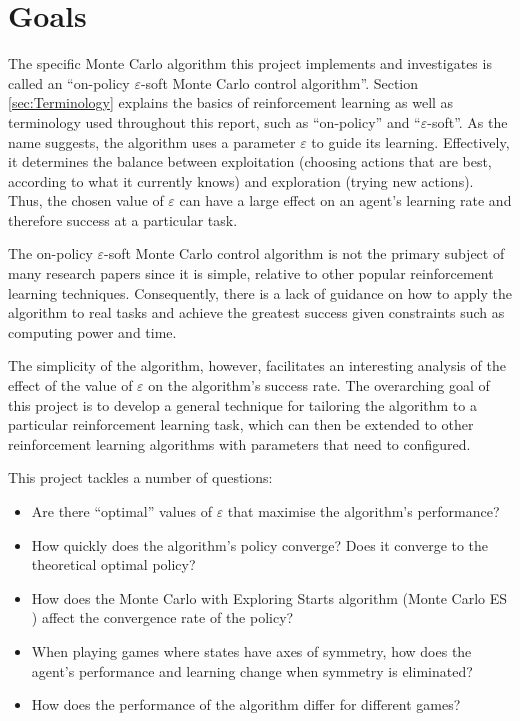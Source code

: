 \documentclass[11pt,a4paper]{report}
\begin{document}
\section{Goals}

The specific Monte Carlo algorithm this project implements and investigates is called an ``on-policy $\varepsilon$-soft Monte Carlo control algorithm''. Section \ref{sec:Terminology} explains the basics of reinforcement learning as well as terminology used throughout this report, such as ``on-policy'' and ``$\varepsilon$-soft''. As the name suggests, the algorithm uses a parameter $\varepsilon$ to guide its learning. Effectively, it determines the balance between exploitation (choosing actions that are best, according to what it currently knows) and exploration (trying new actions). Thus, the chosen value of $\varepsilon$ can have a large effect on an agent's learning rate and therefore success at a particular task.

The on-policy $\varepsilon$-soft Monte Carlo control algorithm is not the primary subject of many research papers since it is simple, relative to other popular reinforcement learning techniques. Consequently, there is a lack of guidance on how to apply the algorithm to real tasks and achieve the greatest success given constraints such as computing power and time.

The simplicity of the algorithm, however, facilitates an interesting analysis of the effect of the value of $\varepsilon$ on the algorithm's success rate. The overarching goal of this project is to develop a general technique for tailoring the algorithm to a particular reinforcement learning task, which can then be extended to other reinforcement learning algorithms with parameters that need to configured.

This project tackles a number of questions:

\begin{itemize}
	\item Are there ``optimal'' values of $\varepsilon$ that maximise the algorithm's performance?
	\item How quickly does the algorithm's policy converge? Does it converge to the theoretical optimal policy?
    \item How does the Monte Carlo with Exploring Starts algorithm (Monte Carlo ES \cite{rl-book}) affect the convergence rate of the policy?
	\item When playing games where states have axes of symmetry, how does the agent's 
performance and learning change when symmetry is eliminated?
	\item How does the performance of the algorithm differ for different games?
\end{itemize}
\end{document}
